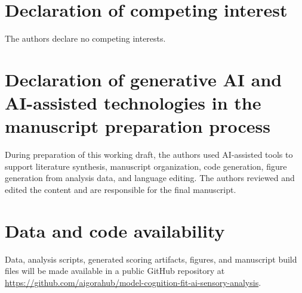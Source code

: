 \documentclass[12pt]{article}
\begin{document}
\section*{Declaration of competing interest}

The authors declare no competing interests.

\section*{Declaration of generative AI and AI-assisted technologies in the manuscript preparation process}

During preparation of this working draft, the authors used AI-assisted tools to support literature synthesis, manuscript organization, code generation, figure generation from analysis data, and language editing. The authors reviewed and edited the content and are responsible for the final manuscript.

\section*{Data and code availability}

Data, analysis scripts, generated scoring artifacts, figures, and manuscript build files will be made available in a public GitHub repository at \url{https://github.com/aigorahub/model-cognition-fit-ai-sensory-analysis}.
\end{document}
